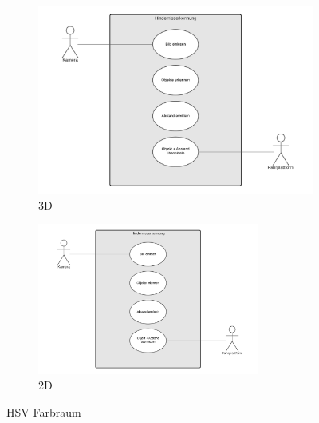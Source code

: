 \begin{figure}[H]
	\begin{subfigure}{0.3\textwidth}	
		\centering
		\includegraphics[width=1\textwidth]{chapters/cheatsheet/images/UseCaseNeu.png}
		\caption[HSV Farbraum 3D - Bildquelle: \cite{opencvfarbraum}]{3D \cite{opencvfarbraum}}
		\label{fig:hsv1}
	\end{subfigure}%
	\begin{subfigure}{0.7\textwidth}
		\centering
		\includegraphics[width=0.8\textwidth]{chapters/cheatsheet/images/UseCaseNeu.png}
		\caption[HSV Farbraum 2D - Bildquelle: \cite{hsv1}]{2D \cite{hsv1}}
		\label{fig:hsv2}
	\end{subfigure}%
	\caption[HSV Farbraum - Bildquelle: \cite{hsv1}]{HSV Farbraum}
\end{figure}



